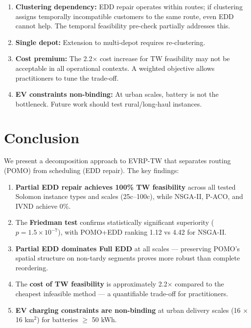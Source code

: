 \documentclass[11pt,a4paper]{article}
\begin{document}
\begin{enumerate}[nosep]
    \item \textbf{Clustering dependency:} EDD repair operates within routes; if clustering
    assigns temporally incompatible customers to the same route, even EDD cannot help.
    The temporal feasibility pre-check partially addresses this.
    \item \textbf{Single depot:} Extension to multi-depot requires re-clustering.
    \item \textbf{Cost premium:} The 2.2$\times$ cost increase for TW feasibility may
    not be acceptable in all operational contexts. A weighted objective allows
    practitioners to tune the trade-off.
    \item \textbf{EV constraints non-binding:} At urban scales, battery is not the
    bottleneck. Future work should test rural/long-haul instances.
\end{enumerate}

\section{Conclusion}

We present a decomposition approach to EVRP-TW that separates routing (POMO)
from scheduling (EDD repair). The key findings:

\begin{enumerate}[nosep]
    \item \textbf{Partial EDD repair achieves 100\% TW feasibility} across all
    tested Solomon instance types and scales (25c--100c), while NSGA-II, P-ACO,
    and IVND achieve 0\%.
    \item The \textbf{Friedman test} confirms statistically significant superiority
    ($p = 1.5 \times 10^{-7}$), with POMO+EDD ranking 1.12 vs 4.42 for NSGA-II.
    \item \textbf{Partial EDD dominates Full EDD} at all scales — preserving
    POMO's spatial structure on non-tardy segments proves more robust than
    complete reordering.
    \item The \textbf{cost of TW feasibility} is approximately 2.2$\times$
    compared to the cheapest infeasible method — a quantifiable trade-off for
    practitioners.
    \item \textbf{EV charging constraints are non-binding} at urban delivery
    scales (16 $\times$ 16 km$^2$) for batteries $\geq$ 50 kWh.
\end{enumerate}
\end{document}
